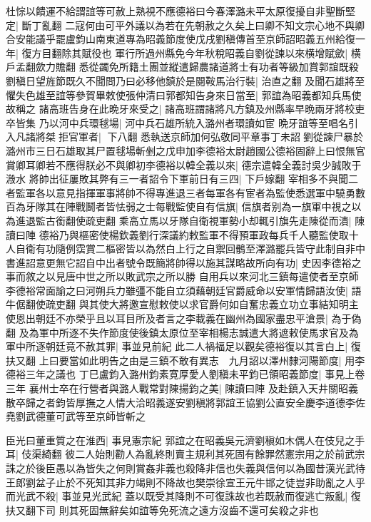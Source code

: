 杜悰以饋運不給謂誼等可赦上熟視不應德裕曰今春澤潞未平太原復擾自非聖斷堅定|{
	斷丁亂翻}
二寇何由可平外議以為若在先朝赦之久矣上曰卿不知文宗心地不與卿合安能議乎罷盧鈞山南東道專為昭義節度使戊戌劉稹傳首至京師詔昭義五州給復一年|{
	復方目翻除其賦役也}
軍行所過州縣免今年秋稅昭義自劉從諫以來横增賦歛|{
	横戶孟翻歛力贍翻}
悉從蠲免所籍土團並縱遣歸農諸道將士有功者等級加賞郭誼既殺劉稹日望旌節既久不聞問乃曰必移他鎮於是閱鞍馬治行裝|{
	治直之翻}
及聞石雄將至懼失色雄至誼等參賀畢敕使張仲清曰郭都知告身來日當至|{
	郭誼為昭義都知兵馬使故稱之}
諸高班告身在此晩牙來受之|{
	諸高班謂諸將凡方鎮及州縣率早晩兩牙將校吏卒皆集}
乃以河中兵環毬場|{
	河中兵石雄所統入潞州者環讀如宦}
晩牙誼等至唱名引入凡諸將桀拒官軍者|{
	下八翻}
悉執送京師加何弘敬同平章事丁未詔劉從諫尸暴於潞州市三日石雄取其尸置毬場斬剉之戊申加李德裕太尉趙國公德裕固辭上曰恨無官賞卿耳卿若不應得朕必不與卿初李德裕以韓全義以來|{
	德宗遣韓全義討吳少誠敗于溵水}
將帥出征屢敗其弊有三一者詔令下軍前日有三四|{
	下戶嫁翻}
宰相多不與聞二者監軍各以意見指揮軍事將帥不得專進退三者每軍各有宦者為監使悉選軍中驍勇數百為牙隊其在陣戰鬭者皆怯弱之士每戰監使自有信旗|{
	信旗者别為一旗軍中視之以為進退監古銜翻使疏吏翻}
乘高立馬以牙隊自衛視軍勢小却輒引旗先走陳從而潰|{
	陳讀曰陣}
德裕乃與樞密使楊欽義劉行深議約敕監軍不得預軍政每兵千人聽監使取十人自衛有功隨例霑賞二樞密皆以為然白上行之自禦回鶻至澤潞罷兵皆守此制自非中書進詔意更無它詔自中出者號令既簡將帥得以施其謀略故所向有功|{
	史因李德裕之事而敘之以見唐中世之所以敗武宗之所以勝}
自用兵以來河北三鎮每遣使者至京師李德裕常面諭之曰河朔兵力雖彊不能自立須藉朝廷官爵威命以安軍情歸語汝使|{
	語牛倨翻使疏吏翻}
與其使大將邀宣慰敕使以求官爵何如自奮忠義立功立事結知明主使恩出朝廷不亦榮乎且以耳目所及者言之李載義在幽州為國家盡忠平滄景|{
	為于偽翻}
及為軍中所逐不失作節度使後鎮太原位至宰相楊志誠遣大將遮敕使馬求官及為軍中所逐朝廷竟不赦其罪|{
	事並見前紀}
此二人禍福足以觀矣德裕復以其言白上|{
	復扶又翻}
上曰要當如此明告之由是三鎮不敢有異志　九月詔以澤州隸河陽節度|{
	用李德裕三年之議也}
丁巳盧鈞入潞州鈞素寛厚愛人劉稹未平鈞已領昭義節度|{
	事見上卷三年}
襄州士卒在行營者與潞人戰常對陳揚鈞之美|{
	陳讀曰陣}
及赴鎮入天井關昭義散卒歸之者鈞皆厚撫之人情大洽昭義遂安劉稹將郭誼王協劉公直安全慶李道德李佐堯劉武德董可武等至京師皆斬之

臣光曰董重質之在淮西|{
	事見憲宗紀}
郭誼之在昭義吳元濟劉稹如木偶人在伎兒之手耳|{
	伎渠綺翻}
彼二人始則勸人為亂終則賣主規利其死固有餘罪然憲宗用之於前武宗誅之於後臣愚以為皆失之何則賞姦非義也殺降非信也失義與信何以為國昔漢光武待王郎劉盆子止於不死知其非力竭則不降故也樊崇徐宣王元牛邯之徒豈非助亂之人乎而光武不殺|{
	事並見光武紀}
蓋以既受其降則不可復誅故也若既赦而復逃亡叛亂|{
	復扶又翻下司}
則其死固無辭矣如誼等免死流之遠方沒齒不還可矣殺之非也

